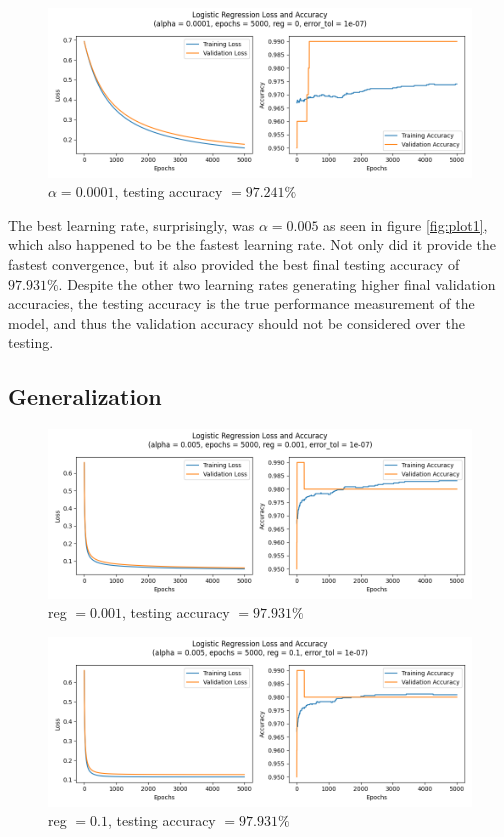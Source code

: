 \documentclass[letter]{article}
\begin{document}
\begin{figure}[H]
	\centering
	\includegraphics[width=\linewidth]{Figure_3}
	\caption{$\alpha = 0.0001$, testing accuracy $ = 97.241\%$}
	\label{fig:plot3}
\end{figure}

The best learning rate, surprisingly, was $\alpha = 0.005$ as seen in figure \ref{fig:plot1}, which also happened to be the fastest learning rate. Not only did it provide the fastest convergence, but it also provided the best final testing accuracy of $97.931\%$. Despite the other two learning rates generating higher final validation accuracies, the testing accuracy is the true performance measurement of the model, and thus the validation accuracy should not be considered over the testing. 

\subsection{Generalization}

\begin{figure}[H]
	\centering
	\includegraphics[width=\linewidth]{Figure_4}
	\caption{reg $ = 0.001$, testing accuracy $ = 97.931\%$}
	\label{fig:plot4}
\end{figure}

\begin{figure}[H]
	\centering
	\includegraphics[width=\linewidth]{Figure_5}
	\caption{reg $ = 0.1$, testing accuracy $ = 97.931\%$}
	\label{fig:plot5}
\end{figure}
\end{document}
